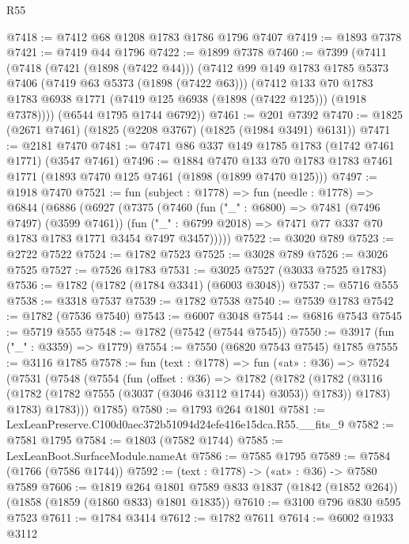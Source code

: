 \begin{lexlean}{R55}
\begin{coremodule}
@7418 := @7412 @68 @1208 @1783 @1786 @1796 @7407
@7419 := @1893 @7378
@7421 := @7419 @44 @1796
@7422 := @1899 @7378
@7460 := @7399
    (@7411
      (@7418
        (@7421 (@1898 (@7422 @44)))
        (@7412
          @99
          @149
          @1783
          @1785
          @5373
          @7406
          (@7419 @63 @5373 (@1898 (@7422 @63)))
          (@7412
            @133
            @70
            @1783
            @1783
            @6938
            @1771
            (@7419 @125 @6938 (@1898 (@7422 @125)))
            (@1918 @7378))))
      (@6544 @1795 @1744 @6792))
@7461 := @201 @7392
@7470 := @1825 (@2671 @7461) (@1825 (@2208 @3767) (@1825 (@1984 @3491) @6131))
@7471 := @2181 @7470
@7481 := @7471 @86 @337 @149 @1785 @1783 (@1742 @7461 @1771) (@3547 @7461)
@7496 := @1884
    @7470
    @133
    @70
    @1783
    @1783
    @7461
    @1771
    (@1893 @7470 @125 @7461 (@1898 (@1899 @7470 @125)))
@7497 := @1918 @7470
@7521 := fun (subject : @1778) =>
  fun (needle : @1778) =>
  @6844
    (@6886
      (@6927
        (@7375
          (@7460
            (fun ("_" : @6800) => @7481 (@7496 @7497) (@3599 @7461))
            (fun ("_" : @6799 @2018) => @7471 @77 @337 @70 @1783 @1783 @1771 @3454 @7497 @3457)))))
@7522 := @3020 @789
@7523 := @2722 @7522
@7524 := @1782 @7523
@7525 := @3028 @789
@7526 := @3026 @7525
@7527 := @7526 @1783
@7531 := @3025 @7527 (@3033 @7525 @1783)
@7536 := @1782 (@1782 (@1784 @3341) (@6003 @3048))
@7537 := @5716 @555
@7538 := @3318 @7537
@7539 := @1782 @7538
@7540 := @7539 @1783
@7542 := @1782 (@7536 @7540)
@7543 := @6007 @3048
@7544 := @6816 @7543
@7545 := @5719 @555
@7548 := @1782 (@7542 (@7544 @7545))
@7550 := @3917 (fun ("_" : @3359) => @1779)
@7554 := @7550 (@6820 @7543 @7545) @1785
@7555 := @3116 @1785
@7578 := fun (text : @1778) =>
  fun («at» : @36) =>
  @7524
    (@7531
      (@7548
        (@7554
          (fun (offset : @36) =>
          @1782
            (@1782
              (@1782 (@3116 (@1782 (@1782 @7555 (@3037 (@3046 @3112 @1744) @3053)) @1783)) @1783)
              @1783)
            @1783)))
      @1785)
@7580 := @1793 @264 @1801
@7581 := LexLeanPreserve.C100d0aec372b51094d24efe416e15dca.R55.__fits_9
@7582 := @7581 @1795
@7584 := @1803 (@7582 @1744)
@7585 := LexLeanBoot.SurfaceModule.nameAt
@7586 := @7585 @1795
@7589 := @7584 (@1766 (@7586 @1744))
@7592 := (text : @1778) -> («at» : @36) -> @7580 @7589
@7606 := @1819
    @264
    @1801
    @7589
    @833
    @1837
    (@1842 (@1852 @264))
    (@1858 (@1859 (@1860 @833) @1801 @1835))
@7610 := @3100 @796 @830 @595 @7523
@7611 := @1784 @3414
@7612 := @1782 @7611
@7614 := @6002 @1933 @3112

\end{coremodule}
\end{lexlean}
